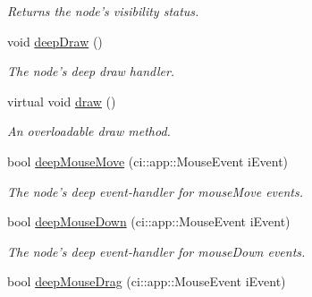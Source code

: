 \begin{DoxyCompactItemize}
\begin{DoxyCompactList}\small\item\em Returns the node's visibility status. \end{DoxyCompactList}\item 
\hypertarget{class_ui_base_a7590087a54659041f4909c7d9206df60}{void \hyperlink{class_ui_base_a7590087a54659041f4909c7d9206df60}{deep\-Draw} ()}\label{class_ui_base_a7590087a54659041f4909c7d9206df60}

\begin{DoxyCompactList}\small\item\em The node's deep draw handler. \end{DoxyCompactList}\item 
\hypertarget{class_ui_base_a8f64c5bdf4888c2cbd95ee2236aac355}{virtual void \hyperlink{class_ui_base_a8f64c5bdf4888c2cbd95ee2236aac355}{draw} ()}\label{class_ui_base_a8f64c5bdf4888c2cbd95ee2236aac355}

\begin{DoxyCompactList}\small\item\em An overloadable draw method. \end{DoxyCompactList}\item 
\hypertarget{class_ui_base_a28f0ee22de1af829ec3808fada5ddfa6}{bool \hyperlink{class_ui_base_a28f0ee22de1af829ec3808fada5ddfa6}{deep\-Mouse\-Move} (ci\-::app\-::\-Mouse\-Event i\-Event)}\label{class_ui_base_a28f0ee22de1af829ec3808fada5ddfa6}

\begin{DoxyCompactList}\small\item\em The node's deep event-\/handler for mouse\-Move events. \end{DoxyCompactList}\item 
\hypertarget{class_ui_base_a691fa41ed84361fe816800b1014b60b7}{bool \hyperlink{class_ui_base_a691fa41ed84361fe816800b1014b60b7}{deep\-Mouse\-Down} (ci\-::app\-::\-Mouse\-Event i\-Event)}\label{class_ui_base_a691fa41ed84361fe816800b1014b60b7}

\begin{DoxyCompactList}\small\item\em The node's deep event-\/handler for mouse\-Down events. \end{DoxyCompactList}\item 
\hypertarget{class_ui_base_ad6e6bde57af053a2ed54749fef1a0e25}{bool \hyperlink{class_ui_base_ad6e6bde57af053a2ed54749fef1a0e25}{deep\-Mouse\-Drag} (ci\-::app\-::\-Mouse\-Event i\-Event)}\label{class_ui_base_ad6e6bde57af053a2ed54749fef1a0e25}


\end{DoxyCompactItemize}
